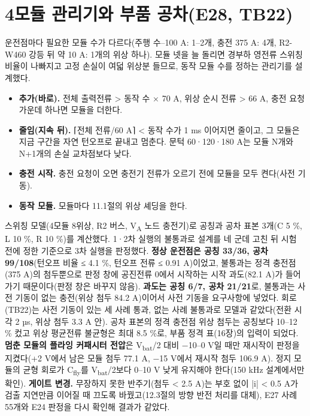 \section{4모듈 관리기와 부품 공차(E28, TB22)}

운전점마다 필요한 모듈 수가 다르다(주행 수–100 A: 1–2개, 충전 375 A: 4개, R2-W460 강등 뒤 약 10 A: 1개의 위상 하나). 모듈 넷을 늘 돌리면 경부하 영전류 스위칭 비율이 나빠지고 고정 손실이 여덟 위상분 들므로, 동작 모듈 수를 정하는 관리기를 설계했다.

\begin{itemize}
\item \textbf{추가(바로).} 전체 출력전류 > 동작 수 × 70 A, 위상 순시 전류 > 66 A, 충전 요청 가운데 하나면 모듈을 더한다.
\item \textbf{줄임(지속 뒤).} ⌈전체 전류/60 A⌉ < 동작 수가 1 ms 이어지면 줄이고, 그 모듈은 지금 구간을 자연 턴오프로 끝내고 멈춘다. 문턱 60·120·180 A는 모듈 N개와 N+1개의 손실 교차점보다 낮다.
\item \textbf{충전 시작.} 충전 요청이 오면 충전기 전류가 오르기 전에 모듈을 모두 켠다(사전 기동).
\item \textbf{동작 모듈.} 모듈마다 11.1절의 위상 셰딩을 한다.
\end{itemize}

스위칭 모델(4모듈 8위상, R2 버스, V\textsubscript{A} 노드 충전기)로 공칭과 공차 표본 3개(C 5 \%, L 10 \%, R 10 \%)를 계산했다. 1·2차 실행의 불통과로 설계를 네 군데 고친 뒤 시험 전에 정한 기준으로 3차 실행을 판정했다. \textbf{정상 운전점은 공칭 33/36, 공차 99/108}(턴오프 비율 ≤ 4.1 \%, 턴오프 전류 ≤ 0.91 A)이었고, 불통과는 정격 충전점(375 A)의 첨두뿐으로 판정 창에 공진전류 0에서 시작하는 시작 과도(82.1 A)가 들어가기 때문이다(판정 창은 바꾸지 않음). \textbf{과도는 공칭 6/7, 공차 21/21}로, 불통과는 사전 기동이 없는 충전(위상 첨두 84.2 A)이어서 사전 기동을 요구사항에 넣었다. 회로(TB22)는 사전 기동이 있는 세 사례 통과, 없는 사례 불통과로 모델과 같았다(전환 시각 2 µs, 위상 첨두 3.3 A 안). 공차 표본의 정격 충전점 위상 첨두는 공칭보다 10–12 \% 컸고 위상 평균전류 불균형은 최대 8.5 \%로, 부품 정격 표(16장)의 입력이 되었다. \textbf{멈춘 모듈의 플라잉 커패시터 전압}은 V\textsubscript{bat}/2 대비 −10–0 V일 때만 재시작이 판정을 지켰다(+2 V에서 남은 모듈 첨두 77.1 A, −15 V에서 재시작 첨두 106.9 A). 정지 모듈의 균형 회로가 C\textsubscript{fly}를 V\textsubscript{bat}/2보다 0–10 V 낮게 유지해야 한다(150 kHz 설계에서만 확인). \textbf{게이트 변경.} 무장하지 못한 반주기(첨두 < 2.5 A)는 부호 없이 |i| < 0.5 A가 검출 지연만큼 이어질 때 끄도록 바꿨고(12.3절의 방향 반전 처리를 대체), E27 사례 55개와 E24 판정을 다시 확인해 결과가 같았다.

